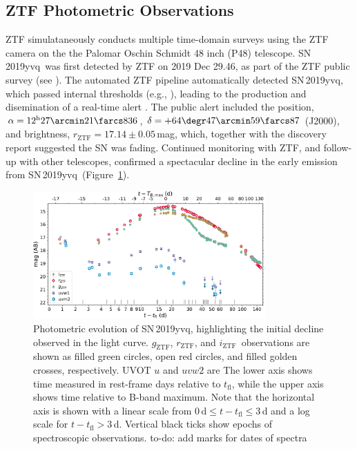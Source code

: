 \documentclass[twocolumn]{aastex63}
\newcommand{\todo}[1]{{\color{magenta} to-do: {#1}}}
\newcommand{\rztf}{$r_\mathrm{ZTF}$}
\newcommand{\gztf}{$g_\mathrm{ZTF}$}
\newcommand{\iztf}{$i_\mathrm{ZTF}$}
\newcommand{\tfl}{$t_\mathrm{fl}$}
\newcommand{\sn}{SN\,2019yvq}
\begin{document}
\subsection{ZTF Photometric Observations}

ZTF simulataneously conducts multiple time-domain surveys using the ZTF
camera on the the Palomar Oschin Schmidt 48 inch (P48) telescope. \sn\ was
first detected by ZTF on 2019 Dec 29.46, as part of the ZTF public survey
(see \citealt{Bellm19a}). The automated ZTF pipeline \citep{Masci19}
automatically detected \sn, which passed internal thresholds (e.g.,
\citealt{Mahabal19}), leading to the production and disemination of a
real-time alert \citep{Patterson19}. The public alert included the position,
$\alpha = 12^{\mathrm{h}}27\arcmin21\farcs836$, $\delta =
+64\degr47\arcmin59\farcs87$ (J2000), and brightness, \rztf$ =
17.14\pm0.05$\,mag, which, together with the \citet{Itagaki19} discovery
report suggested the SN was fading. Continued monitoring with ZTF, and
follow-up with other telescopes, confirmed a spectacular decline in the early
emission from \sn\ (Figure~\ref{fig:p48}).

\begin{figure}
    \centering
    \includegraphics[width=3.5in]{./figures/P48_lc.pdf}
    \caption{Photometric evolution of \sn, highlighting the initial decline
    observed in the light curve. \gztf, \rztf, and \iztf\ observations are
    shown as filled green circles, open red circles, and filled golden
    crosses, respectively. UVOT $u$ and $uvw2$ are The lower axis shows time
    measured in rest-frame days relative to \tfl, while the upper axis shows
    time relative to B-band maximum. Note that the horizontal axis is shown
    with a linear scale from $0\,\mathrm{d} \le t - t_\mathrm{fl} \le 3$\,d
    and a log scale for $t - t_\mathrm{fl} > 3$\,d. Vertical black ticks show
    epochs of spectroscopic observations. \todo{add marks for dates of
    spectra}}
    \label{fig:p48}
\end{figure}
\end{document}
